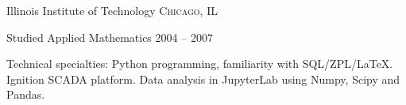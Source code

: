 \documentclass[10pt,a4paper]{article} %
\begin{document}


\spacedhrule{-0.2em}{-0.4em} %



\headedsection %
{Illinois Institute of Technology}
{\textsc{Chicago, IL}} {

\headedsubsection %
{Studied Applied Mathematics}
{2004 -- 2007}
{}}


\spacedhrule{0.5em}{-0.4em} %



\inlineheadsection %
{Technical specialties:}
{Python programming, familiarity with SQL/ZPL/LaTeX.  Ignition SCADA platform.  Data analysis in JupyterLab using Numpy, Scipy and Pandas. }




\spacedhrule{1.6em}{-0.4em} %
\end{document}
